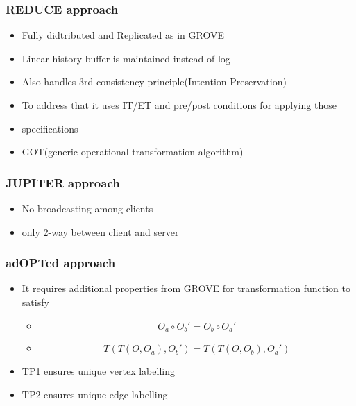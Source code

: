   
  
  
  \subsubsection{REDUCE approach}
  \begin{itemize}
  \item {
  Fully didtributed and Replicated as in GROVE  
  }
  \item {
    Linear history buffer is maintained instead of log
  }
  \item {
   Also handles 3rd consistency principle(Intention Preservation)
  }
  \item {
  To address that it uses IT/ET and pre/post conditions for applying those
  }
  \item{
  specifications
  }
  \item{
 GOT(generic operational transformation algorithm)
  }
  \end{itemize}

  
  
  
\subsubsection{JUPITER approach}
  \begin{itemize}
  \item {
    No broadcasting among clients
  }
  \item {
    only 2-way between client and server
  }
 
  \end{itemize}


  
  
\subsubsection{adOPTed approach}
  \begin{itemize}
  \item {
    It requires additional properties from GROVE for transformation function to satisfy
    \begin{itemize}
    \item{
     $$O_a \circ O_b' = O_b \circ O_a'$$
    } 
    \item{
   $$T(T(O,O_a),O_b')=T(T(O,O_b),O_a')$$ 
    }
    
    
    \end{itemize}
  }
  \item {
    TP1 ensures unique vertex labelling 
  }
  \item {
   TP2 ensures unique edge labelling
  }
 
  \end{itemize}
  
